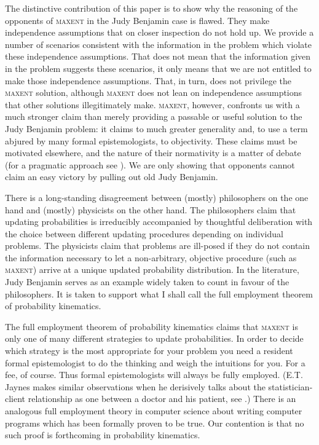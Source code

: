 The distinctive contribution of this paper is to show why the
reasoning of the opponents of \textsc{maxent} in the Judy Benjamin
case is flawed. They make independence assumptions that on closer
inspection do not hold up. We provide a number of scenarios consistent
with the information in the problem which violate these independence
assumptions. That does not mean that the information given in the
problem suggests these scenarios, it only means that we are not
entitled to make those independence assumptions. That, in turn, does
not privilege the \textsc{maxent} solution, although \textsc{maxent}
does not lean on independence assumptions that other solutions
illegitimately make. \textsc{maxent}, however, confronts us with a
much stronger claim than merely providing a passable or useful
solution to the Judy Benjamin problem: it claims to much greater
generality and, to use a term abjured by many formal epistemologists,
to objectivity. These claims must be motivated elsewhere, and the
nature of their normativity is a matter of debate (for a pragmatic
approach see ). We are only showing that
opponents cannot claim an easy victory by pulling out old Judy
Benjamin.

There is a long-standing disagreement between (mostly) philosophers on
the one hand and (mostly) physicists on the other hand. The
philosophers claim that updating probabilities is irreducibly
accompanied by thoughtful deliberation with the choice between
different updating procedures depending on individual problems. The
physicists claim that problems are ill-posed if they do not contain
the information necessary to let a non-arbitrary, objective procedure
(such as \textsc{maxent}) arrive at a unique updated probability
distribution. In the literature, Judy Benjamin serves as an example
widely taken to count in favour of the philosophers. It is taken to
support what I shall call the full employment theorem of probability
kinematics.

The full employment theorem of probability kinematics claims that
\textsc{maxent} is only one of many different strategies to update
probabilities. In order to decide which strategy is the most
appropriate for your problem you need a resident formal epistemologist
to do the thinking and weigh the intuitions for you. For a fee, of
course. Thus formal epistemologists will always be fully employed.
(E.T. Jaynes makes similar observations when he derisively talks about
the statistician-client relationship as one between a doctor and his
patient, see .) There is an
analogous full employment theory in computer science about writing
computer programs which has been formally proven to be true. Our
contention is that no such proof is forthcoming in probability
kinematics.

